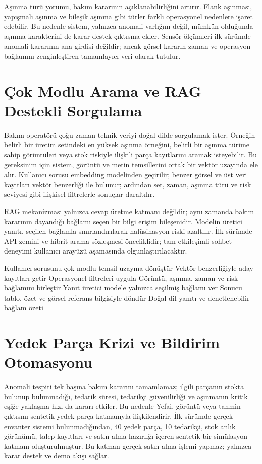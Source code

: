 \documentclass[conference]{IEEEtran}
\begin{document}
Aşınma türü yorumu, bakım kararının açıklanabilirliğini artırır. Flank aşınması, yapışmalı aşınma ve bileşik aşınma gibi türler farklı operasyonel nedenlere işaret edebilir. Bu nedenle sistem, yalnızca anomali varlığını değil, mümkün olduğunda aşınma karakterini de karar destek çıktısına ekler. Sensör ölçümleri ilk sürümde anomali kararının ana girdisi değildir; ancak görsel kararın zaman ve operasyon bağlamını zenginleştiren tamamlayıcı veri olarak tutulur.

\section{Çok Modlu Arama ve RAG Destekli Sorgulama}
Bakım operatörü çoğu zaman teknik veriyi doğal dilde sorgulamak ister. Örneğin belirli bir üretim setindeki en yüksek aşınma örneğini, belirli bir aşınma türüne sahip görüntüleri veya stok riskiyle ilişkili parça kayıtlarını aramak isteyebilir. Bu gereksinim için sistem, görüntü ve metin temsillerini ortak bir vektör uzayında ele alır. Kullanıcı sorusu embedding modelinden geçirilir; benzer görsel ve üst veri kayıtları vektör benzerliği ile bulunur; ardından set, zaman, aşınma türü ve risk seviyesi gibi ilişkisel filtrelerle sonuçlar daraltılır.

RAG mekanizması yalnızca cevap üretme katmanı değildir; aynı zamanda bakım kararının dayandığı bağlamı seçen bir bilgi erişim bileşenidir. Modelin üretici yanıtı, seçilen bağlamla sınırlandırılarak halüsinasyon riski azaltılır. İlk sürümde API zemini ve hibrit arama sözleşmesi önceliklidir; tam etkileşimli sohbet deneyimi kullanıcı arayüzü aşamasında olgunlaştırılacaktır.

\begin{algorithm}[H]
\caption{Hibrit Görsel-Metin Sorgulama Akışı}
\begin{algorithmic}[1]
\STATE Kullanıcı sorusunu çok modlu temsil uzayına dönüştür
\STATE Vektör benzerliğiyle aday kayıtları getir
\STATE Operasyonel filtreleri uygula
\STATE Görüntü, aşınma, zaman ve risk bağlamını birleştir
\STATE Yanıt üretici modele yalnızca seçilmiş bağlamı ver
\STATE Sonucu tablo, özet ve görsel referans bilgisiyle döndür
\RETURN Doğal dil yanıtı ve denetlenebilir bağlam özeti
\end{algorithmic}
\end{algorithm}

\section{Yedek Parça Krizi ve Bildirim Otomasyonu}
Anomali tespiti tek başına bakım kararını tamamlamaz; ilgili parçanın stokta bulunup bulunmadığı, tedarik süresi, tedarikçi güvenilirliği ve aşınmanın kritik eşiğe yaklaşma hızı da kararı etkiler. Bu nedenle Yefai, görüntü veya tahmin çıktısını sentetik yedek parça katmanıyla ilişkilendirir. İlk sürümde gerçek envanter sistemi bulunmadığından, 40 yedek parça, 10 tedarikçi, stok anlık görünümü, talep kayıtları ve satın alma hazırlığı içeren sentetik bir simülasyon katmanı oluşturulmuştur. Bu katman gerçek satın alma işlemi yapmaz; yalnızca karar destek ve demo akışı sağlar.
\end{document}
